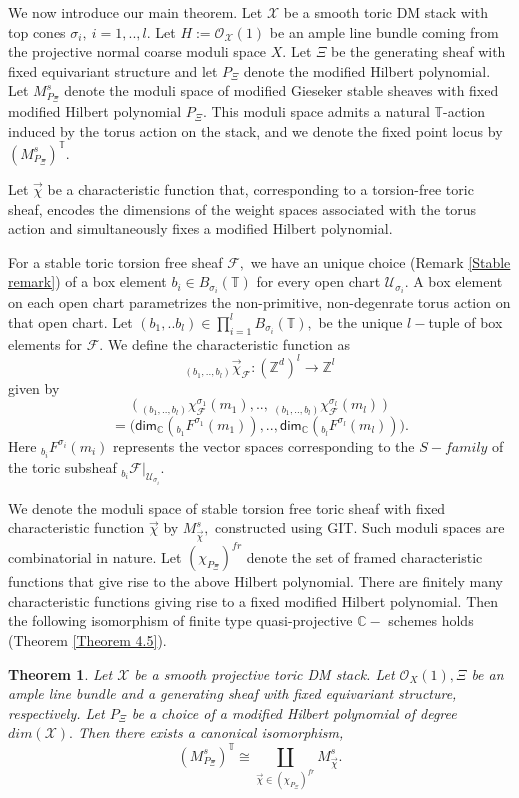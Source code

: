 \documentclass[10pt]{amsart}
\newtheorem{thm}[prop]{Theorem}
\newcommand{\sO}{{\mathcal O}}
\newcommand{\sX}{{\mathcal X}}
\numberwithin{equation}{subsection}
\begin{document}
We now introduce our main theorem. Let $\sX$ be a smooth toric DM stack with top cones $\sigma_i,\ i=1,..,l$. Let $H:=\sO_{\sX}(1)$ be an ample line bundle coming from the projective normal coarse moduli space $X$. Let $\Xi$ be the generating sheaf with fixed equivariant structure and let $P_{\Xi}$ denote the modified Hilbert polynomial. Let $M^s_{P_{\Xi}}$ denote the moduli space of modified Gieseker stable sheaves with fixed modified Hilbert polynomial $P_{\Xi}$. This moduli space admits a natural $\mathbb{T}$-action induced by the torus action on the stack, and we denote the fixed point locus by $(M^s_{P_{\Xi}})^{\mathbb{T}}$.\par
Let $\vec\chi$ be a characteristic function that, corresponding to a torsion-free toric sheaf, encodes the dimensions of the weight spaces associated with the torus action and simultaneously fixes a modified Hilbert polynomial. \par
For a stable toric torsion free sheaf $\mathscr{F},$ we have an unique choice (Remark \ref{Stable remark}) of a box element $b_i\in B_{\sigma_i}(\mathbb{T})$ for every open chart $\mathscr{U}_{\sigma_i}.$ A box element on each open chart parametrizes the non-primitive, non-degenrate torus action on that open chart. Let $(b_1,..b_l)\in \prod_{i=1}^{l}B_{\sigma_{i}}(\mathbb{T}),$ be the unique $l-$tuple of box elements for $\mathscr{F}.$ We define the characteristic function as
$$_{(b_1,..,b_l)}\vec\chi_{\mathscr{F}}:(\mathbb{Z}^d)^{l}\to \mathbb{Z}^l$$ given by
$$\big(\ _{(b_1,..,b_l)}\chi^{\sigma_1}_{\mathscr{F}}(m_1),..,\ _{(b_1,..,b_l)}\chi^{\sigma_l}_{\mathscr{F}}(m_l)\ \big)$$
$$=\big(\mathsf{dim}_{\mathbb{C}}(_{b_1}F^{\sigma_{1}}(m_1)),..,\mathsf{dim}_{\mathbb{C}}(_{b_l}F^{\sigma_l}(m_l))\big).$$
Here $_{b_i}F^{\sigma_{i}}(m_i)$ represents the vector spaces corresponding to the $S-family$ of the toric subsheaf $_{b_i}\mathscr{F}|_{\mathscr{U}_{\sigma_i}}.$\par  %
We denote the moduli space of stable torsion free toric sheaf with fixed characteristic function $\vec\chi$ by $M^s_{\vec\chi},$ constructed using GIT. Such moduli spaces are combinatorial in nature. Let $(\chi_{P_{\Xi}})^{fr}$ denote the set of framed characteristic functions that give rise to the above Hilbert polynomial. There are finitely many characteristic functions giving rise to a fixed modified Hilbert polynomial. Then the following isomorphism of finite type quasi-projective $\mathbb{C}-$ schemes holds (Theorem \ref{Theorem 4.5}). 
\begin{thm}
Let $\sX$ be a smooth projective toric DM stack. Let $\sO_{X}(1),\Xi$ be an ample line bundle and a generating sheaf with fixed equivariant structure, respectively. Let $P_{\Xi}$ be a choice of a modified Hilbert polynomial of degree $dim(\sX). $ Then there exists a canonical isomorphism,
$$(M^{s}_{P_{\Xi}})^{\mathbb T} \cong \coprod \limits_{\vec\chi\in (\chi_{P_{\Xi}})^{fr}}M^{s}_{\vec\chi}.$$
\end{thm} \par
\end{document}

